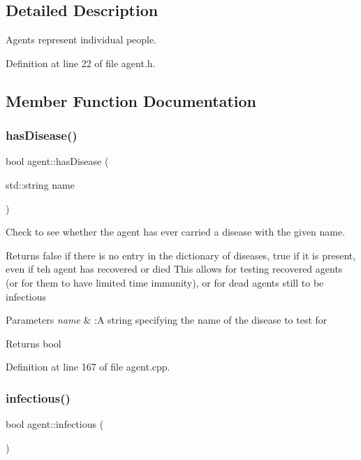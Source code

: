 \subsection{Detailed Description}
Agents represent individual people. 

Definition at line 22 of file agent.\+h.



\subsection{Member Function Documentation}
\mbox{\label{classagent_aab67fe9df4777af3690138fa97d0a3a1}} 
\subsubsection{\texorpdfstring{has\+Disease()}{hasDisease()}}
{\footnotesize\ttfamily bool agent\+::has\+Disease (\begin{DoxyParamCaption}\item[{std\+::string}]{name }\end{DoxyParamCaption})}



Check to see whether the agent has ever carried a disease with the given name. 

Returns false if there is no entry in the dictionary of diseases, true if it is present, even if teh agent has recovered or died This allows for testing recovered agents (or for them to have limited time immunity), or for dead agents still to be infectious


\begin{DoxyParams}{Parameters}
{\em name} & \+:A string specifying the name of the disease to test for \\
\hline
\end{DoxyParams}
\begin{DoxyReturn}{Returns}
bool 
\end{DoxyReturn}


Definition at line 167 of file agent.\+cpp.

\mbox{\label{classagent_ae186a297218e835ac064bf7a329d5b42}} 
\subsubsection{\texorpdfstring{infectious()}{infectious()}}
{\footnotesize\ttfamily bool agent\+::infectious (\begin{DoxyParamCaption}{ }\end{DoxyParamCaption})}



